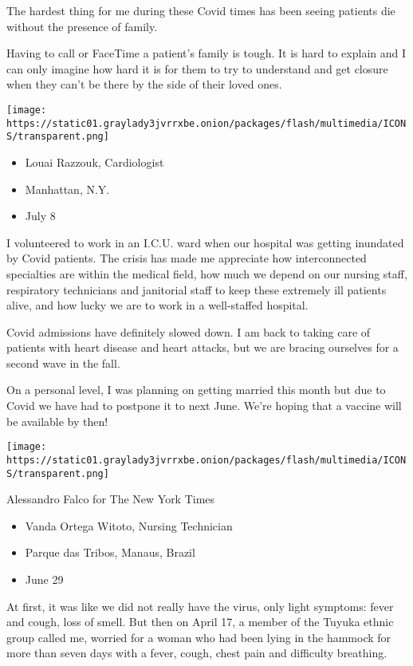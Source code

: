 The hardest thing for me during these Covid times has been seeing
patients die without the presence of family.

Having to call or FaceTime a patient's family is tough. It is hard to
explain and I can only imagine how hard it is for them to try to
understand and get closure when they can't be there by the side of their
loved ones.

\texttt{[image: https://static01.graylady3jvrrxbe.onion/packages/flash/multimedia/ICONS/transparent.png]}

\begin{itemize}
\tightlist
\item
  Louai Razzouk, Cardiologist
\item
  Manhattan, N.Y.
\item
  July 8
\end{itemize}

I volunteered to work in an I.C.U. ward when our hospital was getting
inundated by Covid patients. The crisis has made me appreciate how
interconnected specialties are within the medical field, how much we
depend on our nursing staff, respiratory technicians and janitorial
staff to keep these extremely ill patients alive, and how lucky we are
to work in a well-staffed hospital.

Covid admissions have definitely slowed down. I am back to taking care
of patients with heart disease and heart attacks, but we are bracing
ourselves for a second wave in the fall.

On a personal level, I was planning on getting married this month but
due to Covid we have had to postpone it to next June. We're hoping that
a vaccine will be available by then!

\texttt{[image: https://static01.graylady3jvrrxbe.onion/packages/flash/multimedia/ICONS/transparent.png]}

Alessandro Falco for The New York Times

\begin{itemize}
\tightlist
\item
  Vanda Ortega Witoto, Nursing Technician
\item
  Parque das Tribos, Manaus, Brazil
\item
  June 29
\end{itemize}

At first, it was like we did not really have the virus, only light
symptoms: fever and cough, loss of smell. But then on April 17, a member
of the Tuyuka ethnic group called me, worried for a woman who had been
lying in the hammock for more than seven days with a fever, cough, chest
pain and difficulty breathing.

